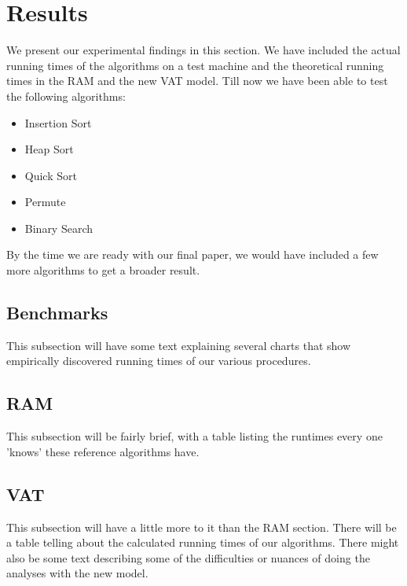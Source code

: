 \section{Results}

We present our experimental findings in this section. We have included the actual running times of the algorithms on a test machine and the theoretical running times in the RAM and the new VAT model. Till now we have been able to test the following algorithms:

  \begin{itemize}
    \item Insertion Sort
    \item Heap Sort
    \item Quick Sort
    \item Permute
    \item Binary Search
  \end{itemize}
  
By the time we are ready with our final paper, we would have included a few more algorithms to get a broader result.
  
  \subsection{Benchmarks}
     This subsection will have some text explaining several charts that show
     empirically discovered running times of our various procedures.

  \subsection{RAM}
     This subsection will be fairly brief, with a table listing the runtimes
     every one 'knows' these reference algorithms have.

  \subsection{VAT}
     This subsection will have a little more to it than the RAM section. There
     will be a table telling about the calculated running times of our 
     algorithms. There might also be some text describing some of the 
     difficulties or nuances of doing the analyses with the new model.
